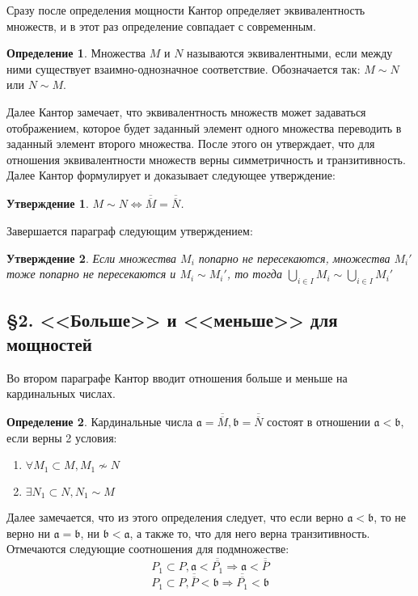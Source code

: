 \documentclass[a4paper,12pt]{extarticle}
\newtheorem{utv}{Утверждение}
\theoremstyle{definition}
\newtheorem{definition}{Определение}
\newcommand{\car}[1]{\overline{\overline{#1}}}
\begin{document}
Сразу после определения мощности Кантор определяет эквивалентность множеств, и в этот раз определение совпадает с современным.
\begin{definition}
Множества $M$ и $N$ называются эквивалентными, если между ними существует взаимно-однозначное соответствие. Обозначается так: $M \sim N$ или $N \sim M$.
\end{definition}

Далее Кантор замечает, что эквивалентность множеств может задаваться отображением, которое будет заданный элемент одного множества переводить в заданный элемент второго множества.
После этого он утверждает, что для отношения эквивалентности множеств верны симметричность и транзитивность.
Далее Кантор формулирует и доказывает следующее утверждение:
\begin{utv}
\label{simeq}
    $M \sim N \iff \car{M} = \car{N}$.
\end{utv}
Завершается параграф следующим утверждением:
\begin{utv}
\label{manysim}
Если множества $M_i$ попарно не пересекаются, множества $M_i'$ тоже попарно не пересекаются и $M_i \sim M_i'$, то тогда $\bigcup\limits_{i \in I} M_i \sim \bigcup\limits_{i \in I} M_i'$
\end{utv}

\subsection{\S 2. <<Больше>> и <<меньше>> для мощностей}
Во втором параграфе Кантор вводит отношения больше и меньше на кардинальных числах.

\begin{definition}
    \label{def-less}
    Кардинальные числа $\mathfrak{a} = \car{M}, \mathfrak{b} = \car{N}$ состоят в отношении $\mathfrak{a} < \mathfrak{b}$, если верны 2 условия:
    \begin{enumerate}
        \item $\forall M_1 \subset M, M_1 \nsim N$
        \item $\exists N_1 \subset N, N_1 \sim M$
    \end{enumerate}
\end{definition}
Далее замечается, что из этого определения следует, что если верно $\mathfrak{a} < \mathfrak{b}$, то не верно ни $\mathfrak{a} = \mathfrak{b}$, ни $\mathfrak{b} < \mathfrak{a}$,
а также то, что для него верна транзитивность.
Отмечаются следующие соотношения для подмножестве:
$$
P_1 \subset P, \mathfrak{a} < \car{P_1} \Rightarrow \mathfrak{a} < \car{P}
$$
$$
P_1 \subset P, \car{P} < \mathfrak{b} \Rightarrow \car{P_1} < \mathfrak{b}
$$
\end{document}
